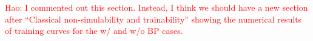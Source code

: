 \documentclass{article}
\theoremstyle{plain}
\newtheorem{theorem}{Theorem}[section]
\theoremstyle{definition}
\theoremstyle{remark}
\newtheorem{remark}[theorem]{Remark}
\newcommand{\hw}[1]{\textcolor{red}{Hao: #1}}
\begin{document}

\hw{I commented out this section. Instead, I think we should have a new section after ``Classical non-simulability and trainability'' showing the numerical results of training curves for the w/ and w/o BP cases.}

\end{document}
